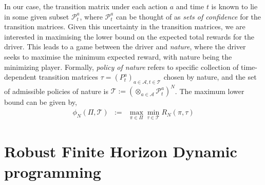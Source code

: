 In our case, the transition matrix under each action $a$ and time $t$ is known to lie in some given subset $\mathcal{P}^{a}_t$, where $\mathcal{P}^{a}_t$ can be thought of as \textit{sets of confidence} for the transition matrices. Given this uncertainty in the transition matrices, we are interested in maximising the lower bound on the expected total rewards for the driver. This leads to a game between the driver and \textit{nature}, where the driver seeks to maximise the minimum expected reward, with nature being the minimizing player. Formally, \textit{policy of nature} refers to specific collection of time-dependent transition matrices $\tau = (P^{a}_t)_{a \in \mathcal{A}, t \in \mathcal{T}}$ chosen by nature, and the set of admissible policies of nature is $\mathcal{T} := (\otimes_{a \in \mathcal{A}} \mathcal{P}^{a}_t)^N$. The maximum lower bound can be given by,
\begin{eqnarray}
\phi_N(\Pi, \mathcal{T}) &:=& \max_{\pi \in \Pi} \min_{\tau \in \mathcal{T}} R_N(\pi, \tau)
\end{eqnarray}

\section{Robust Finite Horizon Dynamic programming} \label{section:robust-dynamic-programming}

